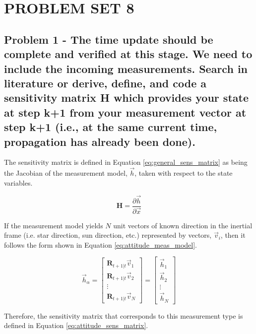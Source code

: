 \section{\Large PROBLEM SET 8}

\subsection{Problem 1 - The time update should be complete and verified at this stage. We need to include the incoming measurements. Search in literature or derive, define, and code a sensitivity matrix H which provides your state at step k+1 from your measurement vector at step k+1 (i.e., at the same current time, propagation has already been done).}

The sensitivity matrix is defined in Equation \ref{eq:general_sens_matrix} as being the Jacobian of the measurement model, $\vec{h}$, taken with respect to the state variables.

\begin{equation} \label{eq:general_sens_matrix}
    \boldsymbol{H} = \frac{\partial \vec{h}}{\partial \vec{x}}
\end{equation}

If the measurement model yields $N$ unit vectors of known direction in the inertial frame (i.e. star direction, sun direction, etc.) represented by vectors, $\vec{v}_i$, then it follows the form shown in Equation \ref{eq:attitude_meas_model}.

\begin{equation} \label{eq:attitude_meas_model}
    \vec{h}_{\alpha} = \begin{bmatrix}
        \boldsymbol{R}_{t+1 \vert t} \vec{v}_1 \\
        \boldsymbol{R}_{t+1 \vert t} \vec{v}_2 \\
        \vdots \\
        \boldsymbol{R}_{t+1 \vert t} \vec{v}_N
    \end{bmatrix} = \begin{bmatrix}
        \vec{h}_1 \\
        \vec{h}_2 \\
        \vdots \\
        \vec{h}_N
    \end{bmatrix}
\end{equation}

Therefore, the sensitivity matrix that corresponds to this measurement type is defined in Equation \ref{eq:attitude_sens_matrix}.


